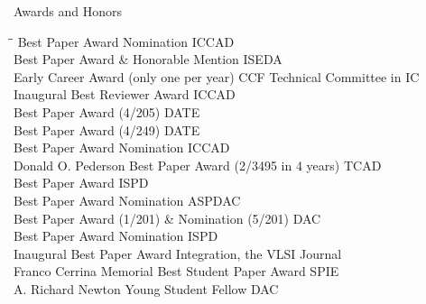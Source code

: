 
\begin{rSection}{Awards and Honors}
\begin{tabbing}
\hspace{3.8in}\= \hspace{2.6in}\= \kill
Best Paper Award Nomination \> ICCAD  \\
Best Paper Award \& Honorable Mention \> ISEDA  \\
Early Career Award (only one per year) \> CCF Technical Committee in IC  \\
Inaugural Best Reviewer Award \> ICCAD  \\
Best Paper Award (4/205) \> DATE  \\
Best Paper Award (4/249) \> DATE  \\
Best Paper Award Nomination \> ICCAD  \\
Donald O. Pederson Best Paper Award (2/3495 in 4 years) \> TCAD  \\
Best Paper Award \> ISPD  \\
Best Paper Award Nomination \> ASPDAC  \\
Best Paper Award (1/201) \& Nomination (5/201) \> DAC  \\
Best Paper Award Nomination \> ISPD  \\
Inaugural Best Paper Award \> Integration, the VLSI Journal  \\
Franco Cerrina Memorial Best Student Paper Award \> SPIE  \\
A. Richard Newton Young Student Fellow \> DAC  \\
\end{tabbing}
\end{rSection}

